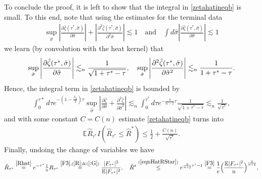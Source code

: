 \documentclass[english, letterpaper,12pt,reqno]{amsart}
\theoremstyle{remark}
\theoremstyle{plain}
\newcommand{\1}{\mathbf{1}}
\newcommand{\E}{\mathbb{E}}
\def\bbE{\mathbb E}
\def\bbR{\mathbb R}
\begin{document}
%
%
\noindent
To conclude the proof, it is left to show that the integral in \eqref{zetahatineqb} is small. To this end, note that using the estimates for the terminal data 
%
\begin{align*}
    \sup_{\hat\sigma } \left|\frac{\partial \hat{\zeta}( \tau^*,\hat{\sigma})}{\partial {\hat\sigma}}\right|+\left|\frac{\partial^2 \hat{\zeta}(\tau^*,\hat{\sigma})}{\partial^2 {\hat \sigma } }\right| 
    \lesssim 1
    \quad \text{and} \quad
        \int d{\hat{\sigma}}\left|\frac{\partial \hat{\zeta}( \tau^*,\hat{\sigma})}{\partial {\hat\sigma}}\right| 
    \lesssim 1
\end{align*}
%
we learn (by convolution with the heat kernel) that 
%
\begin{align*}
 \sup_{ \hat \sigma } \left|\frac{\partial \hat{\zeta} ( \tau^* , \hat\sigma ) }{\partial \hat{\sigma}}\right|  \lesssim_{ n }  \frac{1}{ \sqrt{1+ \tau^*- \tau}}, \hskip 10pt \sup_{ \hat\sigma } \left|\frac{\partial^2 \hat{\zeta}  ( \tau^* , \hat\sigma ) }{\partial \hat{\sigma}^2}\right| 
    \lesssim_{ n } \frac{1}{ 1+ \tau^*- \tau} .
\end{align*}
%
Hence, the integral term in \eqref{zetahatineqb} is bounded by
%
\begin{align*} \int_0^{\tau*}d\tau e^{ - ( 1 - \frac{ \lambda_2 }{ 2 } ) \tau}  \sup_{\hat \sigma}\left|\frac{\partial \hat \zeta}{\partial\hat \sigma}+ \frac{\partial^2 \hat \zeta}{\partial\hat \sigma^2} \right|  \lesssim_{ n }  \int_0^{\tau^*} d\tau e^{-\frac{4}{n-1} \tau  } \frac{1}{\sqrt{1+\tau^*-\tau}} \lesssim_{ n }  \frac{ 1 }{\sqrt{\tau^*}},
\end{align*}
%
and with some constant $ C = C ( n ) $ estimate \eqref{zetahatineqb} turns into
%
\begin{align}\label{ontheotherhand}
 \bbE \hat R_{ \tau^* } I( \hat R_{ \tau^* } \leq \hat{R}^*) \leq \frac{ 1 }{ 2 } +   \frac{ C(n) }{ \sqrt{ \tau^* } }.
\end{align}
%
Finally, undoing the change of variables we have
%
\begin{align*}
	\hat R_{ \tau^* }
	\stackrel{ \eqref{Rhat} }{ = } e^{ - \tau^* } { \textstyle \frac{ 1 }{ n } } R_{ \tau^* }
	\stackrel{ \ref{F3} , (\ref{R}) \& (\ref{:G}) }{ = } \frac{ | F_{ \tau^* } |^2 }{ \E | F_{ \tau^* } |^2 } ,
	\quad 
	\hat R^{ * }
	\stackrel{ (\ref{eqnHatRStar}) }{ \leq } e^{ \frac{ 2 }{ n + 2 } \tau^* - 1 } 
	\stackrel{\ref{F3}  }{ = } \frac{ 1 }{ e } \Big( \frac{ \E | F_{ \tau^* } |^2  }{ n } \Big)^{ \frac{ 2 }{ n + 2 } } ,
\end{align*}
\end{document}
